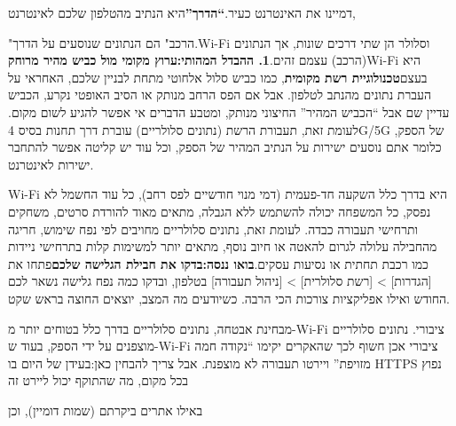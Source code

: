 


דמיינו את האינטרנט כעיר.\textbf{“הדרך”}היא הנתיב מהטלפון שלכם לאינטרנט,

\begin{tcbinfo}{"הרכב"}
הם הנתונים שנוסעים על הדרך.Wi-Fi וסלולר הן שתי דרכים שונות, אך הנתונים (הרכב) עצמם זהים.\textbf{1. ההבדל המהותי:ערוץ מקומי מול כביש מהיר מרוחק}Wi-Fi היא בעצם\textbf{טכנולוגיית רשת מקומית}, כמו כביש סלול אלחוטי מתחת לבניין שלכם, האחראי על העברת נתונים מהנתב לטלפון. אבל אם הפס הרחב מנותק או הסיב האופטי נקרע, הכביש עדיין שם אבל “הכביש המהיר” החיצוני מנותק, ומטבע הדברים אי אפשר להגיע לשום מקום. לעומת זאת, תעבורת הרשת (נתונים סלולריים) עוברת דרך תחנות בסיס 4G/5G של הספק, כלומר אתם נוסעים ישירות על הנתיב המהיר של הספק, וכל עוד יש קליטה אפשר להתחבר ישירות לאינטרנט.

\end{tcbinfo}


Wi-Fi היא בדרך כלל השקעה חד-פעמית (דמי מנוי חודשיים לפס רחב), כל עוד החשמל לא נפסק, כל המשפחה יכולה להשתמש ללא הגבלה, מתאים מאוד להורדת סרטים, משחקים ותרחישי תעבורה כבדה. לעומת זאת, נתונים סלולריים מחויבים לפי נפח שימוש, חריגה מהחבילה עלולה לגרום להאטה או חיוב נוסף, מתאים יותר למשימות קלות בתרחישי ניידות כמו רכבת תחתית או נסיעות עסקים.\textbf{בואו ננסה:בדקו את חבילת הגלישה שלכם}פתחו את [הגדרות] > [רשת סלולרית] > [ניהול תעבורה] בטלפון, ובדקו כמה נפח גלישה נשאר לכם החודש ואילו אפליקציות צורכות הכי הרבה. כשיודעים מה המצב, יוצאים החוצה בראש שקט.


מבחינת אבטחה, נתונים סלולריים בדרך כלל בטוחים יותר מ-Wi-Fi ציבורי. נתונים סלולריים מוצפנים על ידי הספק, בעוד ש-Wi-Fi ציבורי אכן חשוף לכך שהאקרים יקימו “נקודה חמה מזויפת” ויירטו תעבורה לא מוצפנת. אבל צריך להבחין כאן:בעידן של היום בו HTTPS נפוץ בכל מקום, מה שהתוקף יכול ליירט זה

\begin{tcbpractice}{באילו אתרים ביקרתם}
(שמות דומיין), וכן

\end{tcbpractice}

